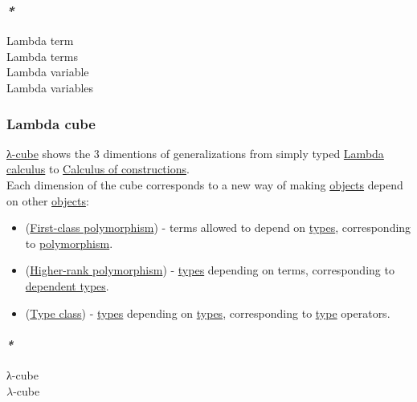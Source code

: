 \documentclass[11pt]{article}
\begin{document}
\subsubsection{\emph{*}}
\label{sec:orgec0d7a9}

\label{org5ce3248}Lambda term\\
\label{orgccc21f9}Lambda terms\\
\label{orgf0772b9}Lambda variable\\
\label{orga563e11}Lambda variables\\

\subsubsection{\label{org0007eb3}Lambda cube}
\label{sec:orge82bc1f}
\hyperref[orgb01422e]{λ-cube} shows the 3 dimentions of generalizations from simply typed \hyperref[org617da6f]{Lambda calculus} to \hyperref[org3ab98a2]{Calculus of constructions}.\\

Each dimension of the cube corresponds to a new way of making \hyperref[orge0f000f]{objects} depend on other \hyperref[orge0f000f]{objects}:\\
\begin{itemize}
\item (\hyperref[org66635d5]{First-class polymorphism}) - terms allowed to depend on \hyperref[org3927fd9]{types}, corresponding to \hyperref[org4bdf515]{polymorphism}.\\
\item (\hyperref[org9767217]{Higher-rank polymorphism}) - \hyperref[org3927fd9]{types} depending on terms, corresponding to \hyperref[orgae20a26]{dependent types}.\\
\item (\hyperref[orga4a5066]{Type class}) - \hyperref[org3927fd9]{types} depending on \hyperref[org3927fd9]{types}, corresponding to \hyperref[org4fbaeb8]{type} operators.\\
\end{itemize}

\paragraph{\emph{*}}
\label{sec:org7726d23}

\label{orgb01422e}λ-cube\\
\label{org8ee01e4}\(\lambda\)-cube\\
\end{document}
